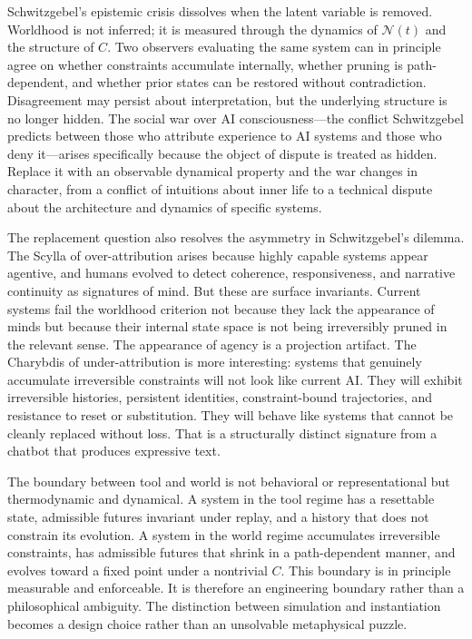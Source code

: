 \documentclass[11pt]{article}
\theoremstyle{definition}
\theoremstyle{remark}
\begin{document}
Schwitzgebel's epistemic crisis dissolves when the latent variable is removed. Worldhood
is not inferred; it is measured through the dynamics of $\mathcal{N}(t)$ and the structure
of $C$. Two observers evaluating the same system can in principle agree on whether constraints
accumulate internally, whether pruning is path-dependent, and whether prior states can be
restored without contradiction. Disagreement may persist about interpretation, but the
underlying structure is no longer hidden. The social war over AI consciousness---the conflict
Schwitzgebel predicts between those who attribute experience to AI systems and those who
deny it---arises specifically because the object of dispute is treated as hidden. Replace
it with an observable dynamical property and the war changes in character, from a conflict
of intuitions about inner life to a technical dispute about the architecture and dynamics
of specific systems.

The replacement question also resolves the asymmetry in Schwitzgebel's dilemma. The Scylla
of over-attribution arises because highly capable systems appear agentive, and humans evolved
to detect coherence, responsiveness, and narrative continuity as signatures of mind. But
these are surface invariants. Current systems fail the worldhood criterion not because they
lack the appearance of minds but because their internal state space is not being irreversibly
pruned in the relevant sense. The appearance of agency is a projection artifact. The
Charybdis of under-attribution is more interesting: systems that genuinely accumulate
irreversible constraints will not look like current AI. They will exhibit irreversible
histories, persistent identities, constraint-bound trajectories, and resistance to reset or
substitution. They will behave like systems that cannot be cleanly replaced without loss.
That is a structurally distinct signature from a chatbot that produces expressive text.

The boundary between tool and world is not behavioral or representational but thermodynamic
and dynamical. A system in the tool regime has a resettable state, admissible futures
invariant under replay, and a history that does not constrain its evolution. A system in
the world regime accumulates irreversible constraints, has admissible futures that shrink
in a path-dependent manner, and evolves toward a fixed point under a nontrivial $C$. This
boundary is in principle measurable and enforceable. It is therefore an engineering boundary
rather than a philosophical ambiguity. The distinction between simulation and instantiation
becomes a design choice rather than an unsolvable metaphysical puzzle.
\end{document}
